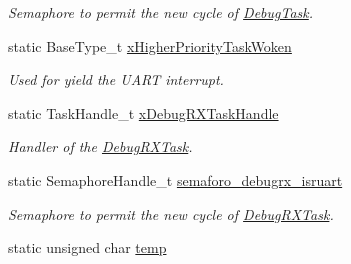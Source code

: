 \begin{DoxyCompactItemize}
\begin{DoxyCompactList}\small\item\em Semaphore to permit the new cycle of \hyperlink{group___debug___exported___functions___group2_ga0e7fca846e34e06a1f62249fe8a30a44}{Debug\+Task}. \end{DoxyCompactList}\item 
static Base\+Type\+\_\+t \hyperlink{group___debug___private___variables_ga9d9a749ad99ec3d4a6886d5277b9ba87}{x\+Higher\+Priority\+Task\+Woken}\hypertarget{group___debug___private___variables_ga9d9a749ad99ec3d4a6886d5277b9ba87}{}\label{group___debug___private___variables_ga9d9a749ad99ec3d4a6886d5277b9ba87}

\begin{DoxyCompactList}\small\item\em Used for yield the U\+A\+RT interrupt. \end{DoxyCompactList}\item 
static Task\+Handle\+\_\+t \hyperlink{group___debug___private___variables_gaea04f335da7bc1dd47446f89a05d2c6d}{x\+Debug\+R\+X\+Task\+Handle}\hypertarget{group___debug___private___variables_gaea04f335da7bc1dd47446f89a05d2c6d}{}\label{group___debug___private___variables_gaea04f335da7bc1dd47446f89a05d2c6d}

\begin{DoxyCompactList}\small\item\em Handler of the \hyperlink{group___debug___exported___functions___group2_ga8013ff117a9e96e630d30771cf9b0199}{Debug\+R\+X\+Task}. \end{DoxyCompactList}\item 
static Semaphore\+Handle\+\_\+t \hyperlink{group___debug___private___variables_gaeefc3248920a99b9436147de4aeff800}{semaforo\+\_\+debugrx\+\_\+isruart}\hypertarget{group___debug___private___variables_gaeefc3248920a99b9436147de4aeff800}{}\label{group___debug___private___variables_gaeefc3248920a99b9436147de4aeff800}

\begin{DoxyCompactList}\small\item\em Semaphore to permit the new cycle of \hyperlink{group___debug___exported___functions___group2_ga8013ff117a9e96e630d30771cf9b0199}{Debug\+R\+X\+Task}. \end{DoxyCompactList}\item 
static unsigned char \hyperlink{group___debug___private___variables_gabe413cb96d839cbe31417aa52d920f21}{temp}
\end{DoxyCompactItemize}


